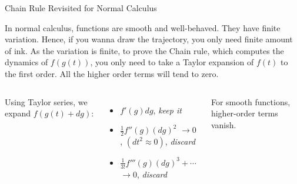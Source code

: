 \documentclass[aspectratio=169,xcolor=dvipsnames,svgnames,x11names,fleqn]{beamer}
\begin{document}
\begin{frame}{Chain Rule Revisited for Normal Calculus}

    In normal calculus, functions are smooth and well-behaved. They have finite variation. Hence, if you wanna draw the trajectory, you only need finite amount of ink. As the variation is finite, to prove the Chain rule, which computes the dynamics of $f(g(t))$, you only need to take a Taylor expansion of $f(t)$ to the first order. All the higher order terms will tend to zero.

    \begin{columns}
        
    
        Using Taylor series, we expand $f(g(t) + dg)$:

            \begin{itemize}
        \item $f'(g)dg$, \textit{keep it}
        \item $\frac{1}{2} f''(g) (dg)^2$ $\to 0$ , $(dt^2 \approx 0)$, \textit{discard}
        \item $\frac{1}{3!}f'''(g)(dg)^3 + \cdots$  $\to 0$, \textit{discard}
    \end{itemize}
    
    For smooth functions, higher-order terms vanish.


\end{columns}
\end{frame}
\end{document}
